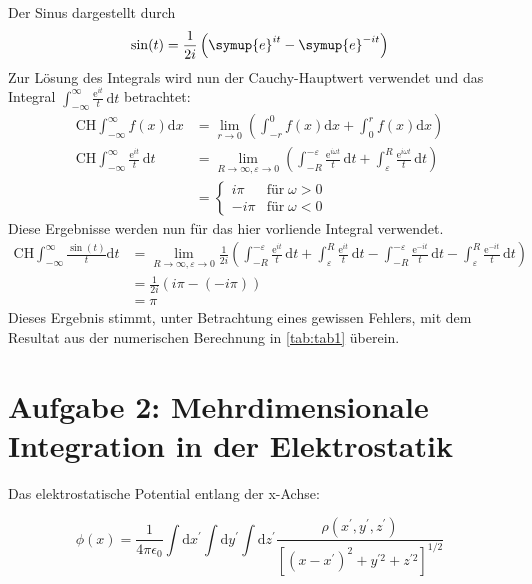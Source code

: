 Der Sinus dargestellt durch
\begin{equation*}
  \sin (t) = \frac{1}{2i} \left(\symup{e}^{it}-\symup{e}^{-it}\right)
\end{equation*}
Zur Lösung des Integrals wird nun der Cauchy-Hauptwert verwendet und das Integral $\int_{-\infty}^{\infty} \frac{\text{e}^{it}}{t} \, \text{d} t$
betrachtet:
\begin{align*}
  \text{CH} \int_{-\infty}^{\infty} f(x) \text{d} x &= \lim_{r \to 0} \left(\int_{-r}^{0}f(x) \text{d} x  + \int_{0}^{r}f(x) \text{d} x\right) \\
  \text{CH} \int_{-\infty}^{\infty} \frac{\text{e}^{it}}{t} \, \text{d} t &= \lim_{R \to \infty, \varepsilon \to 0} \left(\int_{-R}^{-\varepsilon} \frac{\text{e}^{i \omega t}}{t} \, \text{d} t + \int_{\varepsilon}^{R} \frac{\text{e}^{i \omega t}}{t} \, \text{d} t \right) \\
  &= \begin{cases}
  i \pi   & \text{für} \; \omega > 0 \\
  -i \pi  & \text{für} \; \omega < 0
      \end{cases}
\end{align*}
Diese Ergebnisse werden nun für das hier vorliende Integral verwendet.
\begin{align*}
  \text{CH} \int_{-\infty}^{\infty} \frac{\sin (t)}{t} \text{d} t &= \lim_{R \to \infty, \varepsilon \to 0} \frac{1}{2i} \left(\int_{-R}^{-\varepsilon} \frac{\text{e}^{i t}}{t} \, \text{d} t + \int_{\varepsilon}^{R} \frac{\text{e}^{i t}}{t} \, \text{d} t - \int_{-R}^{-\varepsilon} \frac{\text{e}^{-i t}}{t} \, \text{d} t - \int_{\varepsilon}^{R} \frac{\text{e}^{-i t}}{t} \, \text{d} t \right) \\
  &= \frac{1}{2 i} \left(i \pi - \left(-i \pi\right)\right) \\
  &= \pi
\end{align*}
Dieses Ergebnis stimmt, unter Betrachtung eines gewissen Fehlers, mit dem Resultat aus der numerischen Berechnung in \ref{tab:tab1} überein.
\section*{Aufgabe 2: Mehrdimensionale Integration in der Elektrostatik}
Das elektrostatische Potential entlang der x-Achse:

\begin{equation*}
  \phi(x)=\frac{1}{4 \pi \epsilon_{0}} \int \mathrm{d} x^{\prime} \int \mathrm{d} y^{\prime} \int \mathrm{d} z^{\prime} \frac{\rho\left(x^{\prime}, y^{\prime}, z^{\prime}\right)}{\left[\left(x-x^{\prime}\right)^{2}+y^{\prime 2}+z^{\prime 2}\right]^{1 / 2}}
\end{equation*}

